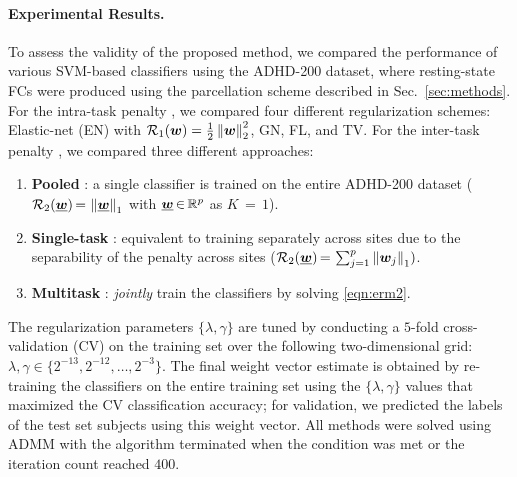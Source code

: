 \vspace{-3pt}\paragraph{Experimental Results.}
To assess the validity of the proposed method, we compared the performance of various SVM-based classifiers using the ADHD-200 dataset, where resting-state FCs were produced using the parcellation scheme described in Sec.~\ref{sec:methods}.
For the intra-task penalty \RegA, we compared four different regularization schemes: Elastic-net (EN) \cite{Chen:2012b} with $\mathcal{R}_1({\bm{w}})=\frac{1}{2}\left\| {\bm{w}} \right\|^2_2$, GN, FL, and TV.  
For the inter-task penalty \RegB, we compared three different approaches:
\begin{enumerate}[leftmargin=14pt]\vspace{-3pt}%
	\item\textbf{Pooled} \ellone: a single classifier is trained on the entire ADHD-200 dataset ($\mathcal{R}_2(\underline{{\bm{w}}})\,{=}\,\left\| \underline{{\bm{w}}} \right\|_1$ with $\underline{{\bm{w}}}\,{\in}\,\mathbb{R}^p$ as $K\,{=}\,1$).
	\item \textbf{Single-task} \STL: equivalent to training separately across sites due to the separability of the penalty across sites ($\mathcal{R}_2(\underline{{\bm{w}}})\,{=}\,\sum_{j=1}^p\left\| {\bm{w}}_j \right\|_1)$.
	\item \textbf{Multitask} \MTL: \emph{jointly} train the classifiers by solving \eqref{eqn:erm2}.
\end{enumerate}\vspace{-3pt}
The regularization parameters $\{\lambda,\gamma\}$ are tuned by conducting a $5$-fold cross-validation (CV) on the training set over the following two-dimensional grid:
$\lambda,\gamma{\in}\{2^{-13},2^{-12},{\dots},2^{-3}\}$.
The final weight vector estimate is obtained by re-training the classifiers on the entire training set using the $\{\lambda,\gamma\}$ values that maximized the CV classification accuracy; 
for validation, we predicted the labels of the test set subjects using this weight vector.
All methods were solved using ADMM with the algorithm terminated when the condition 
was met or the iteration count reached $400$.

